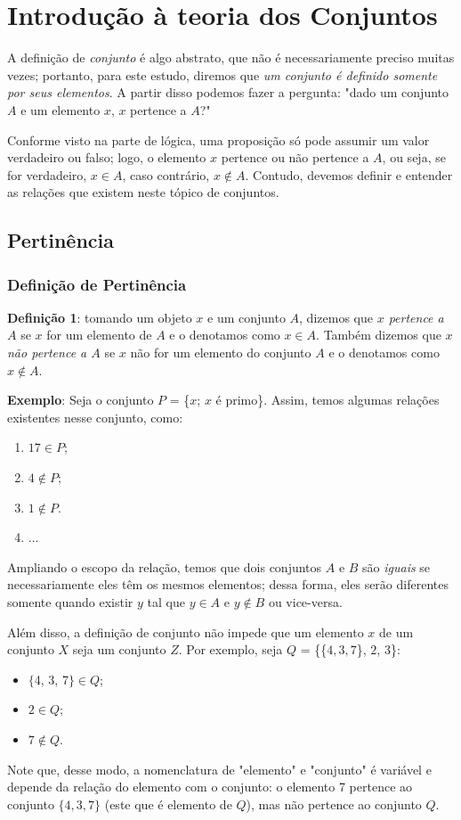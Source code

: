 \documentclass{article}
\begin{document}
\section{Introdução à teoria dos Conjuntos}
A definição de \emph{conjunto} é algo abstrato, que não é necessariamente preciso muitas vezes; portanto, para este estudo, diremos que \emph{um conjunto é definido somente por seus elementos}. A partir disso podemos fazer a pergunta: "dado um conjunto $A$ e um elemento $x$, $x$ pertence a $A$?"
\par
Conforme visto na parte de lógica, uma proposição só pode assumir um valor verdadeiro ou falso; logo, o elemento $x$ pertence ou não pertence a $A$, ou seja, se for verdadeiro, $x \in A$, caso contrário, $x \notin A$. Contudo, devemos definir e entender as relações que existem neste tópico de conjuntos.

\subsection{Pertinência}
\subsubsection{Definição de Pertinência}
\textbf{Definição 1}: tomando um objeto $x$ e um conjunto $A$, dizemos que \emph{$x$ pertence a $A$} se $x$ for um elemento de $A$ e o denotamos como $x \in A$.
Também dizemos que \emph{$x$ não pertence a $A$} se $x$ não for um elemento do conjunto $A$ e o denotamos como $x \notin A$.
\par
\textbf{Exemplo}: Seja o conjunto $P$ = \{$x$; $x$ é primo\}. Assim, temos algumas relações existentes nesse conjunto, como: 
\begin{enumerate}
    \item $17 \in P$;
    \item $4 \notin P$;
    \item $1 \notin P$.
    \item ...
\end{enumerate}
Ampliando o escopo da relação, temos que dois conjuntos $A$ e $B$ são \emph{iguais} se necessariamente eles têm os mesmos elementos; dessa forma, eles serão diferentes somente quando existir $y$ tal que $y \in A$ e $y \notin B$ ou vice-versa.
\par
Além disso, a definição de conjunto não impede que um elemento $x$ de um conjunto $X$ seja um conjunto $Z$. Por exemplo, seja $Q$ = \{\{$4, 3, 7$\}, $2$, $3$\}:
\begin{itemize}
    \item $\{$4, 3, 7$\} \in Q$;
    \item $2 \in Q$;
    \item $7 \notin Q$.
\end{itemize}
Note que, desse modo, a nomenclatura de "elemento" e "conjunto" é variável e depende da relação do elemento com o conjunto: o elemento 7 pertence ao conjunto $\{4, 3, 7\}$ (este que é elemento de $Q$), mas não pertence ao conjunto $Q$.
\end{document}

